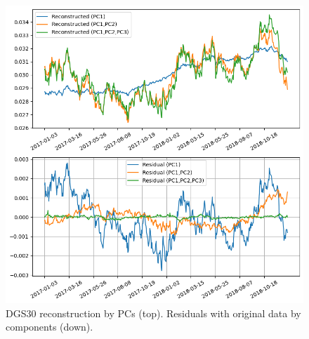 \begin{figure}[hp]
	\centering
	\includegraphics[width=0.7\linewidth]{figures/pca_dsg30}
	\caption{DGS30 reconstruction by PCs (top). Residuals with original data by components (down).}
	\label{fig:pca_dsg30}
\end{figure}

